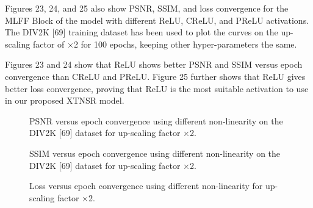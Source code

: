 \documentclass[twocolumn]{svjour3}          %
\begin{document}
Figures 23, 24, and 25 also show PSNR, SSIM, and loss convergence for the MLFF Block of the model with different ReLU, CReLU, and PReLU activations. The DIV2K [69] training dataset has been used to plot the curves on the up-scaling factor of ×2 for 100 epochs, keeping other hyper-parameters the same.

Figures 23 and 24 show that ReLU shows better PSNR and SSIM versus epoch convergence than CReLU and PReLU. Figure 25 further shows that ReLU gives better loss convergence, proving that ReLU is the most suitable activation to use in our proposed XTNSR model.

\begin{figure}
    \centering
    \caption{PSNR versus epoch convergence using different non-linearity on the DIV2K [69] dataset for up-scaling factor ×2.}
    \label{fig:26}
\end{figure}

\begin{figure}
    \centering
    \caption{SSIM versus epoch convergence using different non-linearity on the DIV2K [69] dataset for up-scaling factor ×2.}
    \label{fig:27}
\end{figure}

\begin{figure}
    \centering
    \caption{Loss versus epoch convergence using different non-linearity for up-scaling factor ×2.}
    \label{fig:28}
\end{figure}
\end{document}
